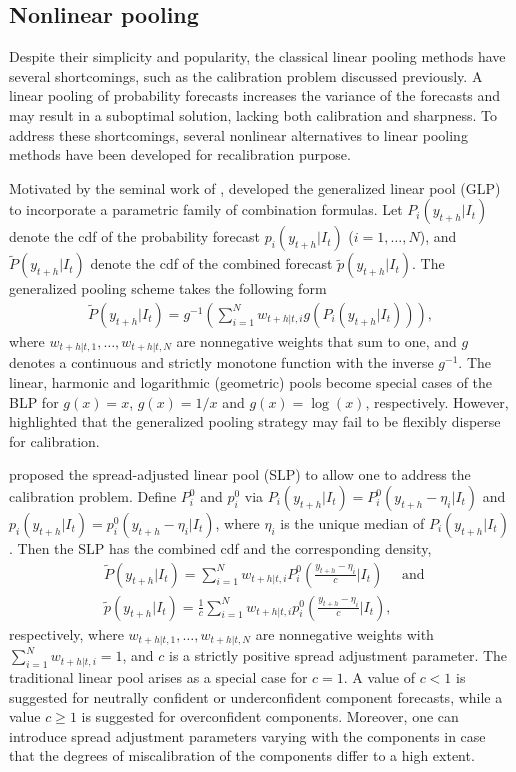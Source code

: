 \documentclass[11pt]{article}
\begin{document}
\subsection{Nonlinear pooling}
\label{sec:nonlinear_pooling}

Despite their simplicity and popularity, the classical linear pooling methods have several shortcomings, such as the calibration problem discussed previously. A linear pooling of probability forecasts increases the variance of the forecasts and may result in a suboptimal solution, lacking both calibration and sharpness. To address these shortcomings, several nonlinear alternatives to linear pooling methods have been developed for recalibration purpose.

Motivated by the seminal work of \citet{Dawid1995-jj}, \citet{Gneiting2013-hl} developed the generalized linear pool (GLP) to incorporate a parametric family of combination formulas. Let $P_{i}(y_{t+h}|I_{t})$ denote the cdf of the probability forecast $p_{i}(y_{t+h}|I_{t})$ ($i=1,\ldots,N$), and $\tilde{P}(y_{t+h}|I_{t})$ denote the cdf of the combined forecast $\tilde{p}(y_{t+h}|I_{t})$. The generalized pooling scheme takes the following form
\begin{align*}
\tilde{P}(y_{t+h}|I_{t}) = g^{-1}\left(\sum_{i=1}^{N} w_{t+h|t,i} g\left(P_{i}(y_{t+h}|I_{t})\right)\right),
\end{align*}
where $w_{t+h|t,1},\ldots,w_{t+h|t,N}$ are nonnegative weights that sum to one, and $g$ denotes a continuous and strictly monotone function with the inverse $g^{-1}$. The linear, harmonic and logarithmic (geometric) pools become special cases of the BLP for $g(x)=x$, $g(x)=1/x$ and $g(x)=\log(x)$, respectively. However, \citet{Gneiting2013-hl} highlighted that the generalized pooling strategy may fail to be flexibly disperse for calibration.

\citet{Gneiting2013-hl} proposed the spread-adjusted linear pool (SLP) to allow one to address the calibration problem. Define $P_{i}^{0}$ and $p_{i}^{0}$ via $P_{i}(y_{t+h}|I_{t})=P_{i}^{0}(y_{t+h}-\eta_{i}|I_{t})$ and $p_{i}(y_{t+h}|I_{t})=p_{i}^{0}(y_{t+h}-\eta_{i}|I_{t})$, where $\eta_{i}$ is the unique median of $P_{i}(y_{t+h}|I_{t})$. Then the SLP has the combined cdf and the corresponding density,
\begin{align*}
&\tilde{P}(y_{t+h}|I_{t})=\sum_{i=1}^{N} w_{t+h|t,i} P_{i}^{0}\left(\frac{y_{t+h}-\eta_{i}}{c}\bigg|I_{t}\right) \quad \text { and }\\
&\tilde{p}(y_{t+h}|I_{t})=\frac{1}{c} \sum_{i=1}^{N} w_{t+h|t,i} p_{i}^{0}\left(\frac{y_{t+h}-\eta_{i}}{c}\bigg|I_{t}\right),
\end{align*}
respectively, where $w_{t+h|t,1},\ldots,w_{t+h|t,N}$ are nonnegative weights with $\sum_{i=1}^{N}w_{t+h|t,i}=1$, and $c$ is a strictly positive spread adjustment parameter. The traditional linear pool arises as a special case for $c = 1$. A value of $c < 1$ is suggested for neutrally confident or underconfident component forecasts, while a value $c \geq 1$ is suggested for overconfident components. Moreover, one can introduce spread adjustment parameters varying with the components in case that the degrees of miscalibration of the components differ to a high extent.
\end{document}
